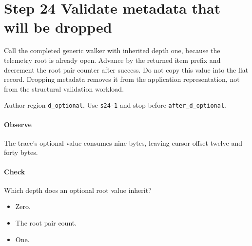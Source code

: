 \section{Step 24 Validate metadata that will be dropped}\label{cbor-s24}
Call the completed generic walker with inherited depth one, because the telemetry root is already open. Advance by the returned item prefix and decrement the root pair counter after success. Do not copy this value into the flat record. Dropping metadata removes it from the application representation, not from the structural validation workload.

Author region \texttt{d\_optional}. Use \texttt{s24-1} and stop before \texttt{after\_d\_optional}.

\paragraph{Observe} The trace's optional value consumes nine bytes, leaving cursor offset twelve and forty bytes.

\paragraph{Check} Which depth does an optional root value inherit?
\begin{itemize}
  \item[A.] Zero.
  \item[B.] The root pair count.
  \item[C.] One.
\end{itemize}
